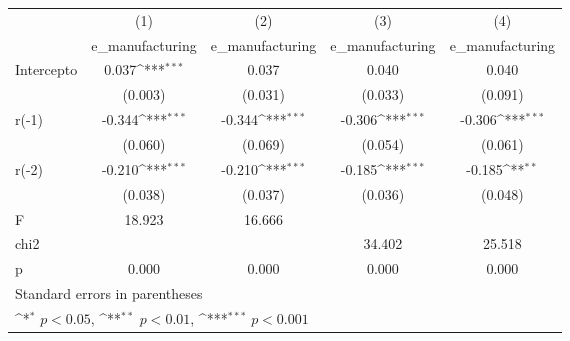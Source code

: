 {
\def\sym#1{\ifmmode^{#1}\else\(^{#1}\)\fi}
\begin{longtable}{l*{4}{c}}
\hline\hline\endfirsthead\hline\endhead\hline\endfoot\endlastfoot
            &\multicolumn{1}{c}{(1)}&\multicolumn{1}{c}{(2)}&\multicolumn{1}{c}{(3)}&\multicolumn{1}{c}{(4)}\\
            &\multicolumn{1}{c}{e\_manufacturing}&\multicolumn{1}{c}{e\_manufacturing}&\multicolumn{1}{c}{e\_manufacturing}&\multicolumn{1}{c}{e\_manufacturing}\\
\hline
Intercepto  &       0.037\sym{***}&       0.037         &       0.040         &       0.040         \\
            &     (0.003)         &     (0.031)         &     (0.033)         &     (0.091)         \\
r(-1)       &      -0.344\sym{***}&      -0.344\sym{***}&      -0.306\sym{***}&      -0.306\sym{***}\\
            &     (0.060)         &     (0.069)         &     (0.054)         &     (0.061)         \\
r(-2)       &      -0.210\sym{***}&      -0.210\sym{***}&      -0.185\sym{***}&      -0.185\sym{**} \\
            &     (0.038)         &     (0.037)         &     (0.036)         &     (0.048)         \\
\hline
F           &      18.923         &      16.666         &                     &                     \\
chi2        &                     &                     &      34.402         &      25.518         \\
p           &       0.000         &       0.000         &       0.000         &       0.000         \\
\hline\hline
\multicolumn{5}{l}{\footnotesize Standard errors in parentheses}\\
\multicolumn{5}{l}{\footnotesize \sym{*} \(p<0.05\), \sym{**} \(p<0.01\), \sym{***} \(p<0.001\)}\\
\end{longtable}
}
